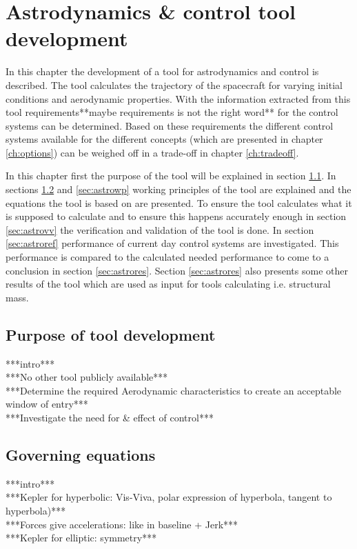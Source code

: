 \section{Astrodynamics \& control tool development}
\label{ch:astrocontrol}
In this chapter the development of a tool for astrodynamics and control is described. The tool calculates the trajectory of the spacecraft for varying initial conditions and aerodynamic properties. With the information extracted from this tool requirements**maybe requirements is not the right word** for the control systems can be determined. Based on these requirements the different control systems available for the different concepts (which are presented in chapter \ref{ch:options}) can be weighed off in a trade-off in chapter \ref{ch:tradeoff}.

In this chapter first the purpose of the tool will be explained in section \ref{sec:astropurpose}. In sections \ref{sec:astrogov} and \ref{sec:astrowp} working principles of the tool are explained and the equations the tool is based on are presented. To ensure the tool calculates what it is supposed to calculate and to ensure this happens accurately enough in section \ref{sec:astrovv} the verification and validation of the tool is done. In section \ref{sec:astroref} performance of current day control systems are investigated. This performance is compared to the calculated needed performance to come to a conclusion in section \ref{sec:astrores}. Section \ref{sec:astrores} also presents some other results of the tool which are used as input for tools calculating i.e. structural mass.

\subsection{Purpose of tool development}
\label{sec:astropurpose}
***intro***\\
***No other tool publicly available***\\
***Determine the required Aerodynamic characteristics to create an acceptable window of entry***\\
***Investigate the need for \& effect of control***\\

\subsection{Governing equations}
\label{sec:astrogov}
***intro***\\
***Kepler for hyperbolic: Vis-Viva, polar expression of hyperbola, tangent to hyperbola)***\\
***Forces give accelerations: like in baseline + Jerk***\\
***Kepler for elliptic: symmetry***\\

